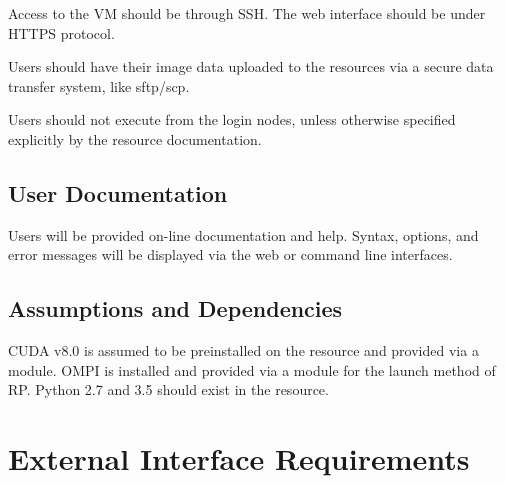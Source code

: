 \documentclass{scrreprt}
\begin{document}
Access to the VM should be through SSH. The web interface should be under HTTPS 
protocol.

Users should have their image data uploaded to the resources via a secure data 
transfer system, like sftp/scp.

Users should not execute from the login nodes, unless otherwise specified explicitly 
by the resource documentation.

\section{User Documentation}

Users will be provided on-line documentation and help.  Syntax, options, and error
messages will be displayed via the web or command line interfaces.

\section{Assumptions and Dependencies}

CUDA v8.0 is assumed to be preinstalled on the resource and provided via a module.
OMPI is installed and provided via a module for the launch method of RP. Python 2.7 
and 3.5 should exist in the resource.

\chapter{External Interface Requirements}
\end{document}
